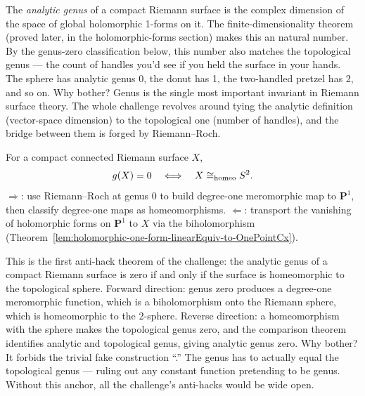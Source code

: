 \begin{layman}
The \emph{analytic genus} of a compact Riemann surface is the complex
dimension of the space of global holomorphic 1-forms on it. The
finite-dimensionality theorem (proved later, in the holomorphic-forms
section) makes this an natural number. By the genus-zero classification below, this number also matches
the topological genus --- the count of handles you'd see if you held the
surface in your hands. The sphere has analytic genus 0, the donut has 1,
the two-handled pretzel has 2, and so on. Why bother? Genus is the
single most important invariant in Riemann surface theory. The whole
challenge revolves around tying the analytic definition (vector-space
dimension) to the topological one (number of handles), and the bridge
between them is forged by Riemann--Roch.
\end{layman}
\begin{theorem}
\label{thm:genus-zero-classification}
For a compact connected Riemann surface \(X\),
\[
  g(X)=0 \quad\Longleftrightarrow\quad X \cong_{\mathrm{homeo}} S^{2} .
\]
\leanok
\proofplan
\(\Rightarrow\): use Riemann--Roch at genus \(0\) to build degree-one meromorphic map
to \(\mathbf{P}^1\), then classify degree-one maps as homeomorphisms.
\(\Leftarrow\): transport the vanishing of holomorphic forms on \(\mathbf{P}^1\)
to \(X\) via the biholomorphism (Theorem~\ref{lem:holomorphic-one-form-linearEquiv-to-OnePointCx}).
\end{theorem}

\begin{layman}
This is the first anti-hack theorem of the challenge: the analytic
genus of a compact Riemann surface is zero if and only if the surface
is homeomorphic to the topological sphere. Forward direction: genus
zero produces a degree-one meromorphic function, which is a
biholomorphism onto the Riemann sphere, which is homeomorphic to the
2-sphere. Reverse direction: a homeomorphism with the sphere makes
the topological genus zero, and the comparison theorem identifies
analytic and topological genus, giving analytic genus zero. Why
bother? It forbids the trivial fake construction
``.'' The genus has to actually equal the
topological genus --- ruling out any constant function pretending to be
genus. Without this anchor, all the challenge's anti-hacks would be
wide open.
\end{layman}


